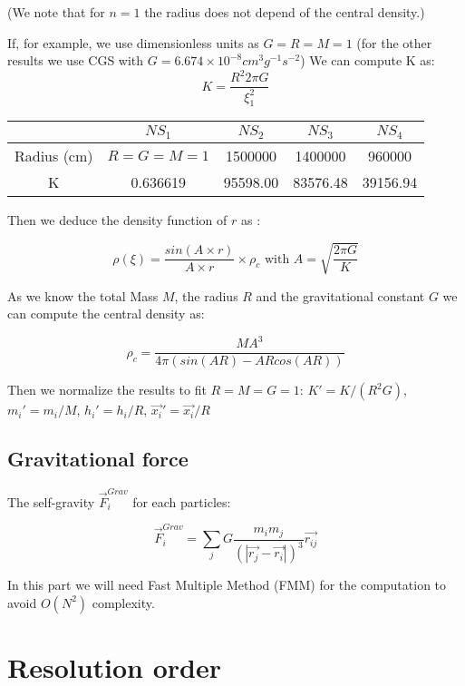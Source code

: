 \documentclass{article}
\begin{document}
(We note that for $n=1$ the radius does not depend of the central density.)

If, for example, we use dimensionless units as $G=R=M=1$ (for the other results we use CGS with $G = 6.674 \times 10^{-8} cm^3g^{-1}s^{-2}$)
We can compute K as:
\begin{equation}
\label{eq:constant}
K = \frac{R^2  2 \pi G}{\xi_1^2}
\end{equation}

\begin{center}

\begin{tabular}{c|c|c|c|c|}
 & $NS_1$ & $NS_2$ & $NS_3$ & $NS_4$ \\
\hline
Radius (cm) & $R=G=M=1$ & 1500000 & 1400000 & 960000 \\
\hline
K & 0.636619 & 95598.00 & 83576.48 & 39156.94\\
\hline
\end{tabular}

\end{center}

Then we deduce the density function of $r$ as :

$$\rho(\xi) = \frac{sin(A\times r)}{A \times r} \times \rho_c \mbox{ with } A = \sqrt{\frac{2\pi G}{K}}
$$

As we know the total Mass $M$, the radius $R$ and the gravitational constant $G$ we can compute the central density as:

$$ \rho_c = \frac{M A^3}{4 \pi (sin(AR)-ARcos(AR)) } $$

Then we normalize the results to fit $R = M = G = 1$: $K' = K/(R^2G) $, $m_i' = m_i/M $, $h_i' = h_i / R$, $\vec{x_i}' = \vec{x_i}/R$


\subsection{Gravitational force}

The self-gravity $\vec{F}_i^{Grav}$ for each particles:

\begin{equation}
\vec{F}_i^{Grav} = \sum_j G\frac{m_im_j}{(|\vec{r_j}-\vec{r_i}|)^3} \vec{r_{ij}}
\end{equation}

In this part we will need Fast Multiple Method (FMM) for the computation to avoid $O(N^2)$ complexity.

\section{Resolution order}
\label{sec:reso}
\end{document}
